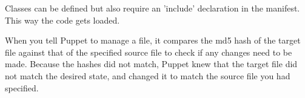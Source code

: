 Classes can be defined but also require an 'include' declaration in the manifest. This way the code gets loaded. 

When you tell Puppet to manage a file, it compares the md5 hash of the target file against that of the specified source file to check if any changes need to be made. Because the hashes did not match, Puppet knew that the target file did not match the desired state, and changed it to match the source file you had specified.
